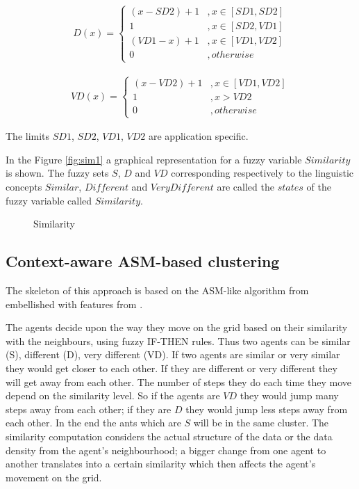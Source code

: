 \begin{align}
D(x) = \left\{
     \begin{array}{lr}
       (x-SD2)+1 & , x \in [SD1, SD2]\\
       1 & , x \in [SD2, VD1]\\
       (VD1-x)+1 & , x \in [VD1, VD2]\\
       0 & , otherwise
     \end{array}
   \right.
\end{align}

\begin{align}
VD(x) = \left\{
     \begin{array}{lr}
       (x-VD2)+1 & , x \in [VD1, VD2]\\
       1 & , x > VD2\\
       0 & , otherwise
     \end{array}
   \right.
\end{align}

The limits $SD1$, $SD2$, $VD1$, $VD2$ are application specific. 

In the Figure \ref{fig:sim1} a graphical representation for a fuzzy variable $Similarity$ is shown. The fuzzy sets $S$, $D$ and $VD$ corresponding respectively to the linguistic concepts $Similar$, $Different$ and $Very Different$ are called the $states$ of the fuzzy variable called $Similarity$.

\begin{figure}[h!]
\label{fig:sim1}
\centerline{}
      \caption{Similarity}
\label{sim}
\end{figure}


\subsection{Context-aware ASM-based clustering}
\label{sec:contextaware}

The skeleton of this approach is based on the ASM-like algorithm from \cite{Chen04AnAdaptive} embellished with features from \cite{Chira07Stigmergic, Gaceanu10AnAdaptive, Schockaert04Fuzzy}. 
	
The agents decide upon the way they move on the grid based on their similarity with the neighbours, using fuzzy IF-THEN rules. Thus two agents can be similar (S), different (D), very different (VD). If two agents are similar or very similar they would get closer to each other. If they are different or very different they will get away from each other. The number of steps they do each time they move depend on the similarity level. So if the agents are $VD$ they would jump many steps away from each other; if they are $D$ they would jump less steps away from each other. In the end the ants which are $S$ will be in the same cluster. 
The similarity computation considers the actual structure of the data or the data density from the agent's neighbourhood; a bigger change from one agent to another translates into a certain similarity which then affects the agent's movement on the grid. 

